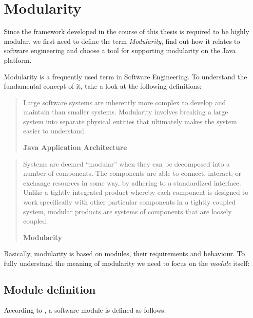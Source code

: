 \section{Modularity}
\label{sec:modularity}

Since the framework developed in the course of this thesis is required to be highly modular, we first need to define the term \textit{Modularity}, find out how it relates to software engineering and choose a tool for supporting modularity on the Java platform.

Modularity is a frequently used term in Software Engineering. To understand the fundamental concept of it, take a look at the following definitions:

\begin{quote}
Large software systems are inherently more complex to develop and maintain than smaller systems. Modularity involves breaking a large system into separate physical entities that ultimately makes the system easier to understand.

\hfill \textbf{Java Application Architecture}

\hfill \citeauthor{Knoernschild:2012} \cite{Knoernschild:2012}
\end{quote}

\begin{quote}
Systems are deemed “modular” when they can be decomposed into a number of components. The components are able to connect, interact, or exchange resources in some way, by adhering to a standardized interface. Unlike a tightly integrated product whereby each component is designed to work specifically with other particular components in a tightly coupled system, modular products are systems of components that are loosely coupled.

\hfill \textbf{Modularity}

\hfill \citeauthor{Wikipedia:Modularity:2012} \cite{Wikipedia:Modularity:2012}
\end{quote}

Basically, modularity is based on modules, their requirements and behaviour. To fully understand the meaning of modularity we need to focus on the \textit{module} itself:

\newpage
\subsection{Module definition}
\label{sec:module}

According to \citeauthor{Knoernschild:2012}, a software module is defined as follows:


